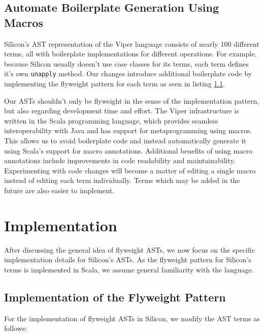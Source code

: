 \documentclass[11pt]{article}
\begin{document}
    \subsection{Automate Boilerplate Generation Using Macros} \label{boilerplate-generation-using-macros}

    Silicon's AST representation of the Viper language consists of nearly 100 different terms,
    all with boilerplate implementations for different operations. For example,
    because Silicon usually doesn't use case classes for its terms,
    each term defines it's own \texttt{unapply} method.
    Our changes introduce additional boilerplate code by implementing
    the flyweight pattern for each term as seen in listing \ref{implementation-flyweight-pattern}.

    Our ASTs shouldn't only be flyweight in the sense of the implementation pattern, but also
    regarding development time and effort.
    The Viper infrastructure is written in the Scala programming language, which 
    provides seamless interoperability with Java and has support
    for metaprogramming using macros. \cite{macros} This allows us to avoid boilerplate
    code and instead automatically generate it using Scala's support for macro annotations.
    Additional benefits of using macro annotations include improvements in code
    readability and maintainability. Experimenting with code changes will become a matter
    of editing a single macro instead of editing each term individually.
    Terms which may be added in the future are also easier to implement.

    \newpage
    \section{Implementation}

    After discussing the general idea of flyweight ASTs, we now focus on the
    specific implementation details for Silicon's ASTs.
    As the flyweight pattern for Silicon's terms is implemented in Scala,
    we assume general familiarity with the language. 

    \subsection{Implementation of the Flyweight Pattern} \label{implementation-flyweight-pattern}

    For the implementation of flyweight ASTs in Silicon, we modify
    the AST terms as follows:
\end{document}
